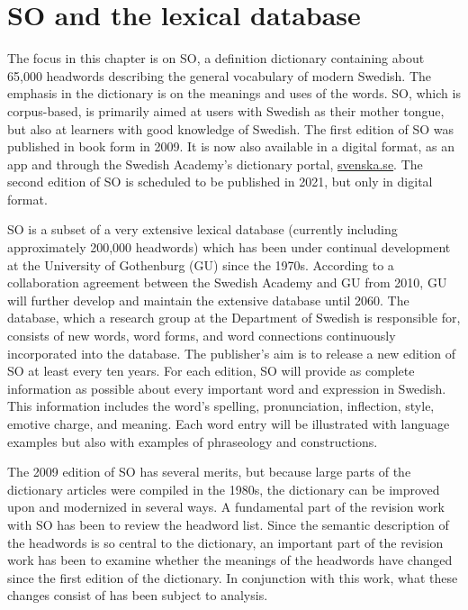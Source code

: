 \documentclass[output=paper]{langscibook}
\begin{document}
\section{SO and the lexical database}\label{secx:so}
The focus in this chapter is on SO, a definition dictionary containing about 65,000 headwords describing the general vocabulary of modern Swedish. The emphasis in the dictionary is on the meanings and uses of the words. SO, which is corpus-based, is primarily aimed at users with Swedish as their mother tongue, but also at learners with good knowledge of Swedish.
The first edition of SO was published in book form in 2009. It is now also available in a digital format, as an app and through the Swedish Academy's dictionary portal, \hyperlink{https://svenska.se}{svenska.se}. The second edition of SO is scheduled to be published in 2021, but only in digital format.

SO is a subset of a very extensive lexical database (currently including approximately 200,000 headwords) which has been under continual development at the University of Gothenburg (GU) since the 1970s. According to a collaboration agreement between the Swedish Academy and GU from  2010, GU will further develop and maintain the extensive database until 2060. The database, which a research group at the Department of Swedish is responsible for, consists of new words, word forms, and word connections continuously incorporated into the database. The publisher's aim is to release a new edition of SO at least every ten years. For each edition, SO will provide as complete information as possible about every important word and expression in Swedish. This information includes the word's spelling, pronunciation, inflection, style, emotive charge, and meaning. Each word entry will be  illustrated with language examples but also with examples of phraseology and constructions.

The 2009 edition of SO has several merits, but because large parts of the dictionary articles were compiled in the 1980s, the dictionary can be improved upon and modernized in several ways. A fundamental part of the revision work with SO has been to review the headword list. Since the semantic description of the headwords is so central to the dictionary, an important part of the revision work has been to examine whether the meanings of the headwords have changed since the first edition of the dictionary. In conjunction with this work, what these changes consist of has been subject to analysis. 
\end{document}
